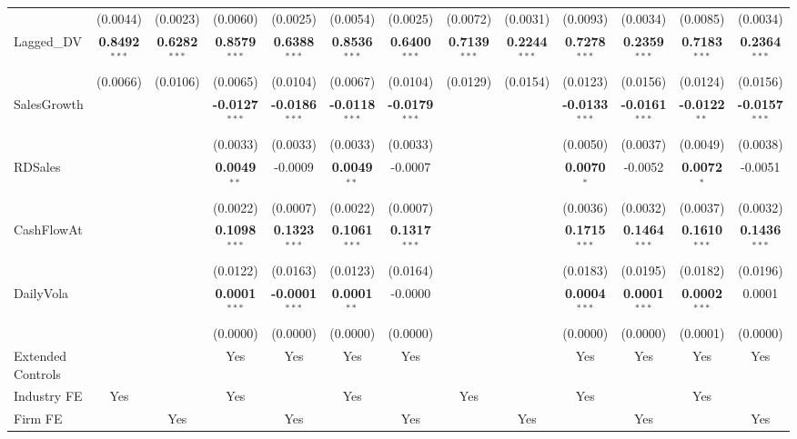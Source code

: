\documentclass[11pt,a4paper]{article}
\begin{document}
\begin{table}[htbp]
\begin{tabular}{lcccccccccccc}
 & (0.0044) & (0.0023) & (0.0060) & (0.0025) & (0.0054) & (0.0025) & (0.0072) & (0.0031) & (0.0093) & (0.0034) & (0.0085) & (0.0034) \\
Lagged\_DV & \textbf{0.8492}$^{***}$ & \textbf{0.6282}$^{***}$ & \textbf{0.8579}$^{***}$ & \textbf{0.6388}$^{***}$ & \textbf{0.8536}$^{***}$ & \textbf{0.6400}$^{***}$ & \textbf{0.7139}$^{***}$ & \textbf{0.2244}$^{***}$ & \textbf{0.7278}$^{***}$ & \textbf{0.2359}$^{***}$ & \textbf{0.7183}$^{***}$ & \textbf{0.2364}$^{***}$ \\
 & (0.0066) & (0.0106) & (0.0065) & (0.0104) & (0.0067) & (0.0104) & (0.0129) & (0.0154) & (0.0123) & (0.0156) & (0.0124) & (0.0156) \\
SalesGrowth &  &  & \textbf{-0.0127}$^{***}$ & \textbf{-0.0186}$^{***}$ & \textbf{-0.0118}$^{***}$ & \textbf{-0.0179}$^{***}$ &  &  & \textbf{-0.0133}$^{***}$ & \textbf{-0.0161}$^{***}$ & \textbf{-0.0122}$^{**}$ & \textbf{-0.0157}$^{***}$ \\
 &  &  & (0.0033) & (0.0033) & (0.0033) & (0.0033) &  &  & (0.0050) & (0.0037) & (0.0049) & (0.0038) \\
RDSales &  &  & \textbf{0.0049}$^{**}$ & -0.0009 & \textbf{0.0049}$^{**}$ & -0.0007 &  &  & \textbf{0.0070}$^{*}$ & -0.0052 & \textbf{0.0072}$^{*}$ & -0.0051 \\
 &  &  & (0.0022) & (0.0007) & (0.0022) & (0.0007) &  &  & (0.0036) & (0.0032) & (0.0037) & (0.0032) \\
CashFlowAt &  &  & \textbf{0.1098}$^{***}$ & \textbf{0.1323}$^{***}$ & \textbf{0.1061}$^{***}$ & \textbf{0.1317}$^{***}$ &  &  & \textbf{0.1715}$^{***}$ & \textbf{0.1464}$^{***}$ & \textbf{0.1610}$^{***}$ & \textbf{0.1436}$^{***}$ \\
 &  &  & (0.0122) & (0.0163) & (0.0123) & (0.0164) &  &  & (0.0183) & (0.0195) & (0.0182) & (0.0196) \\
DailyVola &  &  & \textbf{0.0001}$^{***}$ & \textbf{-0.0001}$^{***}$ & \textbf{0.0001}$^{**}$ & -0.0000 &  &  & \textbf{0.0004}$^{***}$ & \textbf{0.0001}$^{***}$ & \textbf{0.0002}$^{***}$ & 0.0001 \\
 &  &  & (0.0000) & (0.0000) & (0.0000) & (0.0000) &  &  & (0.0000) & (0.0000) & (0.0001) & (0.0000) \\
\midrule
Extended Controls &  &  & Yes & Yes & Yes & Yes &  &  & Yes & Yes & Yes & Yes \\
Industry FE & Yes &  & Yes &  & Yes &  & Yes &  & Yes &  & Yes &  \\
Firm FE &  & Yes &  & Yes &  & Yes &  & Yes &  & Yes &  & Yes \\

\end{tabular}
\end{table}
\end{document}
